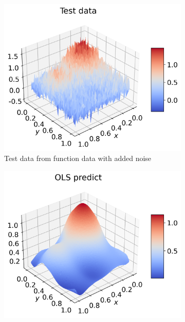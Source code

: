 \documentclass[12pt]{article}
\begin{document}
\begin{figure}[H]
\begin{subfigure}{.5\textwidth}
    \label{fig:extra_pred_train}
  \end{subfigure}
  \begin{subfigure}{.5\textwidth}
    \centering
    \includegraphics[width=\textwidth]{../figures/test_data_franke_extra.png}
    \caption{Test data from function data with added noise}
    \label{fig:extra_pred_test}
  \end{subfigure}
  \begin{subfigure}{.5\textwidth}
    \centering
    \includegraphics[width=\textwidth]{../figures/ols_pred_franke_extra.png}

\end{subfigure}
\end{figure}
\end{document}
